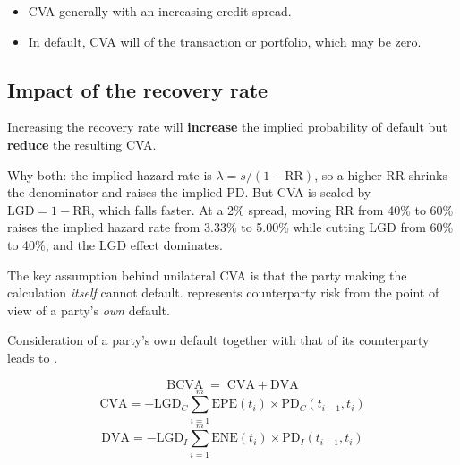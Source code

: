 \begin{itemize}
\item CVA generally  with an increasing credit spread.
\item In default, CVA will  of the transaction or
portfolio, which may be zero.
\end{itemize}

\subsection*{Impact of the recovery rate}

\begin{crtrapbox}
Increasing the recovery rate will \textbf{increase} the implied probability of
default but \textbf{reduce} the resulting CVA.

\smallskip
Why both: the implied hazard rate is $\lambda = s/(1-\mathrm{RR})$, so a higher RR
shrinks the denominator and raises the implied PD. But CVA is scaled by
$\mathrm{LGD} = 1-\mathrm{RR}$, which falls faster. At a 2\% spread, moving RR
from 40\% to 60\% raises the implied hazard rate from 3.33\% to 5.00\% while
cutting LGD from 60\% to 40\%, and the LGD effect dominates.
\end{crtrapbox}


\begin{crdefbox}
The key assumption behind unilateral CVA is that the party making the calculation
\emph{itself} cannot default.  represents
counterparty risk from the point of view of a party's \emph{own} default.

\smallskip
Consideration of a party's own default together with that of its counterparty
leads to .
\end{crdefbox}

\begin{crfmlbox}
\[ \mathrm{BCVA} \;=\; \mathrm{CVA} + \mathrm{DVA} \]
\[ \mathrm{CVA} = -\mathrm{LGD}_C \sum_{i=1}^{m}
   \mathrm{EPE}(t_i)\times \mathrm{PD}_C(t_{i-1},t_i) \]
\[ \mathrm{DVA} = -\mathrm{LGD}_I \sum_{i=1}^{m}
   \mathrm{ENE}(t_i)\times \mathrm{PD}_I(t_{i-1},t_i) \]
\end{crfmlbox}

